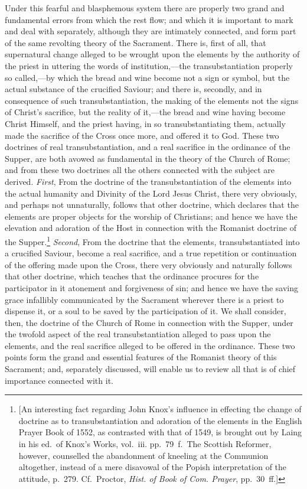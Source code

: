 \documentclass[
]{book}
\begin{document}
Under this fearful and blasphemous system there are properly two grand and fundamental errors from which the rest flow; and which it is important to mark and deal with separately, although they are intimately connected, and form part of the same revolting theory of the Sacrament. There is, first of all, that supernatural change alleged to be wrought upon the elements by the authority of the priest in uttering the words of institution,---the transubstantiation properly so called,---by which the bread and wine become not a sign or symbol, but the actual substance of the crucified Saviour; and there is, secondly, and in consequence of such transubstantiation, the making of the elements not the signs of Christ's sacrifice, but the reality of it,---the bread and wine having become Christ Himself, and the priest having, in so transubstantiating them, actually made the sacrifice of the Cross once more, and offered it to God. These two doctrines of real transubstantiation, and a real sacrifice in the ordinance of the Supper, are both avowed as fundamental in the theory of the Church of Rome; and from these two doctrines all the others connected with the subject are derived. \emph{First}, From the doctrine of the transubstantiation of the elements into the actual humanity and Divinity of the Lord Jesus Christ, there very obviously, and perhaps not unnaturally, follows that other doctrine, which declares that the elements are proper objects for the worship of Christians; and hence we have the elevation and adoration of the Host in connection with the Romanist doctrine of the Supper.\footnote{{[}An interesting fact regarding John Knox's influence in effecting the change of doctrine as to transubstantiation and adoration of the elements in the English Prayer Book of 1552, as contrasted with that of 1549, is brought out by Laing in his ed.~of Knox's Works, vol.~iii. pp.~79~f.~The Scottish Reformer, however, counselled the abandonment of kneeling at the Communion altogether, instead of a mere disavowal of the Popish interpretation of the attitude, p.~279. Cf.~Proctor, \emph{Hist. of Book of Com. Prayer}, pp.~30~ff.{]}} \emph{Second}, From the doctrine that the elements, transubstantiated into a crucified Saviour, become a real sacrifice, and a true repetition or continuation of the offering made upon the Cross, there very obviously and naturally follows that other doctrine, which teaches that the ordinance procures for the participator in it atonement and forgiveness of sin; and hence we have the saving grace infallibly communicated by the Sacrament wherever there is a priest to dispense it, or a soul to be saved by the participation of it. We shall consider, then, the doctrine of the Church of Rome in connection with the Supper, under the twofold aspect of the real transubstantiation alleged to pass upon the elements, and the real sacrifice alleged to be offered in the ordinance. These two points form the grand and essential features of the Romanist theory of this Sacrament; and, separately discussed, will enable us to review all that is of chief importance connected with it.
\end{document}
